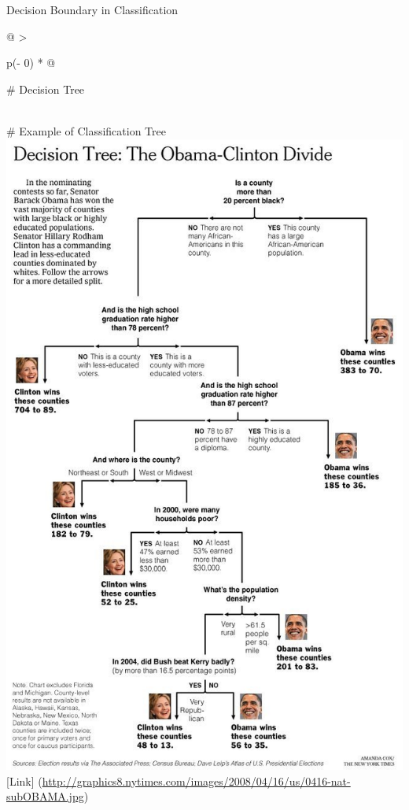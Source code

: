\documentclass[
  ignorenonframetext,
]{beamer}
\begin{document}
\begin{frame}{Decision Boundary in Classification}
\begin{longtable}[]{@{}
  >{\raggedright\arraybackslash}p{(\columnwidth - 0\tabcolsep) * }@{}}
\toprule
\begin{minipage}[b]{\linewidth}\raggedright
\# Decision Tree
\end{minipage} \\
\midrule
\endhead
\# Example of Classification Tree \\
\includegraphics{images/tree2.jpg} \\
{[}Link{]}
(\url{http://graphics8.nytimes.com/images/2008/04/16/us/0416-nat-subOBAMA.jpg}) \\
\bottomrule
\end{longtable}
\end{frame}
\end{document}
